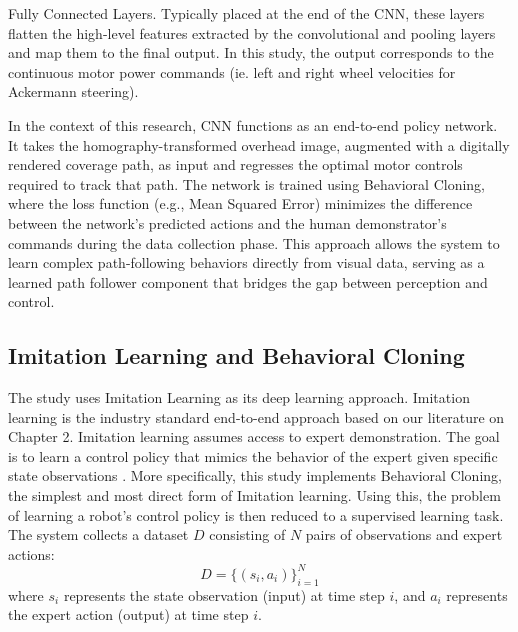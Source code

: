 Fully Connected Layers. Typically placed at the end of the CNN, these layers flatten the high-level features extracted by the convolutional and pooling layers and map them to the final output. In this study, the output corresponds to the continuous motor power commands (ie. left and right wheel velocities for Ackermann steering).

In the context of this research, CNN functions as an end-to-end policy network. It takes the homography-transformed overhead image, augmented with a digitally rendered coverage path, as input and regresses the optimal motor controls required to track that path. The network is trained using Behavioral Cloning, where the loss function (e.g., Mean Squared Error) minimizes the difference between the network's predicted actions and the human demonstrator's commands during the data collection phase. This approach allows the system to learn complex path-following behaviors directly from visual data, serving as a learned path follower component that bridges the gap between perception and control.

\subsection{Imitation Learning and Behavioral Cloning}
The study uses Imitation Learning as its deep learning approach. Imitation learning is the industry standard end-to-end approach based on our literature on Chapter 2. Imitation learning assumes access to expert demonstration. The goal is to learn a control policy  that mimics the behavior of the expert given specific state observations \citep{Osa2018ImitationLearningSurvey}.
More specifically, this study implements Behavioral Cloning, the simplest and most direct form of Imitation learning. Using this, the problem of learning a robot’s control policy is then reduced to a supervised learning task. The system collects a dataset $D$ consisting of $N$ pairs of observations and expert actions:
\[
D = \{(s_i, a_i)\}_{i=1}^{N}
\]
where $s_i$ represents the state observation (input) at time step $i$,
and $a_i$ represents the expert action (output) at time step $i$.
